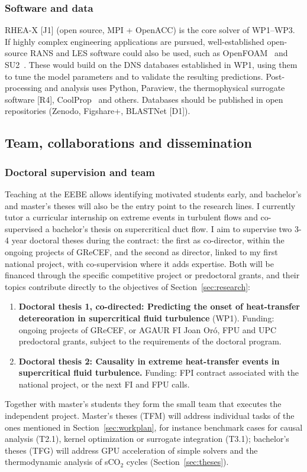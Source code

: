 \documentclass[11pt]{article}
\begin{document}
\subsubsection{Software and data} 
RHEA-X [J1] (open source, MPI + OpenACC) is the core solver of WP1--WP3. 
If highly complex engineering applications are pursued, well-established open-source RANS and LES software could also be used, such as OpenFOAM~\cite{Weller1998} and SU2~\cite{Economon2016}.%
These would build on the DNS databases established in WP1, using them to tune the model parameters and to validate the resulting predictions.
Post-processing and analysis uses Python, Paraview, the thermophysical surrogate software [R4],  CoolProp~\cite{CoolProp2014} and others. 
Databases should be published in open repositories (Zenodo, Figshare+, BLASTNet [D1]).


\subsection{Team, collaborations and dissemination}\label{sec:mobility}\label{sec:dissemination}

\subsubsection{Doctoral supervision and team}
Teaching at the EEBE allows identifying motivated students early, and bachelor's and master's theses will also be the entry point to the research lines. 
I currently tutor a curricular internship on extreme events in turbulent flows and co-supervised a bachelor's thesis on supercritical duct flow. 
I aim to supervise two 3-4 year doctoral theses during the contract: the first as co-director, within the ongoing projects of GReCEF, and the second as director, linked to my first national project, with co-supervision where it adds expertise. 
Both will be financed through the specific competitive project or predoctoral grants, and their topics contribute directly to the objectives of Section~\ref{sec:research}:
\begin{enumerate}
  \item \textbf{Doctoral thesis 1, co-directed: Predicting the onset of heat-transfer detereoration in supercritical fluid turbulence} (WP1). Funding: ongoing projects of GReCEF, or AGAUR FI Joan Or\'o, FPU and UPC predoctoral grants, subject to the requirements of the doctoral program.
  \item \textbf{Doctoral thesis 2: Causality in extreme heat-transfer events in supercritical fluid turbulence.} Funding: FPI contract associated with the national project, or the next FI and FPU calls.
\end{enumerate}
Together with master's students they form the small team that executes the independent project.
Master's theses (TFM) will address individual tasks of the ones mentioned in Section~\ref{sec:workplan}, for instance benchmark cases for causal analysis (T2.1), kernel optimization or surrogate integration (T3.1); bachelor's theses (TFG) will address GPU acceleration of simple solvers and the thermodynamic analysis of sCO$_2$ cycles (Section~\ref{sec:theses}).
\end{document}
